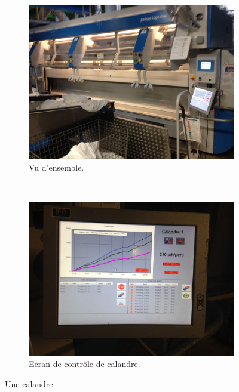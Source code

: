 \documentclass{article}
\newcommand{\rapportSubFigure}{0.069}
\begin{document}
\FloatBarrier
%
\begin{figure}[ht]
    \centering
    \begin{subfigure}{0.49\textwidth}
        \includegraphics[scale= \rapportSubFigure]{images/calandre}
        \caption{Vu d'ensemble.}
        \label{fig:calandre}
    \end{subfigure}
    ~
    \begin{subfigure}{0.49\textwidth}
        \includegraphics[scale= \rapportSubFigure]{images/calandre_controle}
        \caption{Ecran de contrôle de calandre.}
        \label{fig:ecran}
    \end{subfigure}
    
    \caption{Une calandre.}
\end{figure}
%
\FloatBarrier
\end{document}
